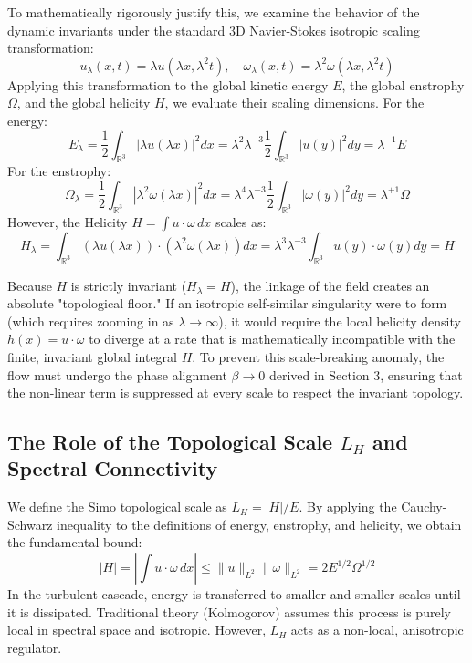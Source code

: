\documentclass[12pt,a4paper]{article}
\theoremstyle{plain}
\theoremstyle{definition}
\theoremstyle{remark}
\begin{document}
To mathematically rigorously justify this, we examine the behavior of the dynamic invariants under the standard 3D Navier-Stokes isotropic scaling transformation:
\begin{equation}
    u_\lambda(x, t) = \lambda u(\lambda x, \lambda^2 t), \quad \omega_\lambda(x, t) = \lambda^2 \omega(\lambda x, \lambda^2 t)
\end{equation}
Applying this transformation to the global kinetic energy $E$, the global enstrophy $\Omega$, and the global helicity $H$, we evaluate their scaling dimensions. For the energy:
\begin{equation}
    E_\lambda = \frac{1}{2} \int_{\mathbb{R}^3} |\lambda u(\lambda x)|^2 dx = \lambda^2 \lambda^{-3} \frac{1}{2} \int_{\mathbb{R}^3} |u(y)|^2 dy = \lambda^{-1} E
\end{equation}
For the enstrophy:
\begin{equation}
    \Omega_\lambda = \frac{1}{2} \int_{\mathbb{R}^3} |\lambda^2 \omega(\lambda x)|^2 dx = \lambda^4 \lambda^{-3} \frac{1}{2} \int_{\mathbb{R}^3} |\omega(y)|^2 dy = \lambda^{+1} \Omega
\end{equation}
However, the Helicity $H = \int u \cdot \omega \, dx$ scales as:
\begin{equation}
    H_\lambda = \int_{\mathbb{R}^3} (\lambda u(\lambda x)) \cdot (\lambda^2 \omega(\lambda x)) dx = \lambda^3 \lambda^{-3} \int_{\mathbb{R}^3} u(y) \cdot \omega(y) dy = H
\end{equation}

Because $H$ is strictly invariant ($H_\lambda = H$), the linkage of the field creates an absolute "topological floor." If an isotropic self-similar singularity were to form (which requires zooming in as $\lambda \to \infty$), it would require the local helicity density $h(x) = u \cdot \omega$ to diverge at a rate that is mathematically incompatible with the finite, invariant global integral $H$. To prevent this scale-breaking anomaly, the flow must undergo the phase alignment $\beta \to 0$ derived in Section 3, ensuring that the non-linear term is suppressed at every scale to respect the invariant topology.

\subsection{The Role of the Topological Scale $L_H$ and Spectral Connectivity}
We define the Simo topological scale as $L_H = |H|/E$. By applying the Cauchy-Schwarz inequality to the definitions of energy, enstrophy, and helicity, we obtain the fundamental bound:
\begin{equation}
    |H| = \left| \int u \cdot \omega \, dx \right| \leq \|u\|_{L^2} \|\omega\|_{L^2} = 2 E^{1/2} \Omega^{1/2}
\end{equation}
In the turbulent cascade, energy is transferred to smaller and smaller scales until it is dissipated. Traditional theory (Kolmogorov) assumes this process is purely local in spectral space and isotropic. However, $L_H$ acts as a non-local, anisotropic regulator.
\end{document}

